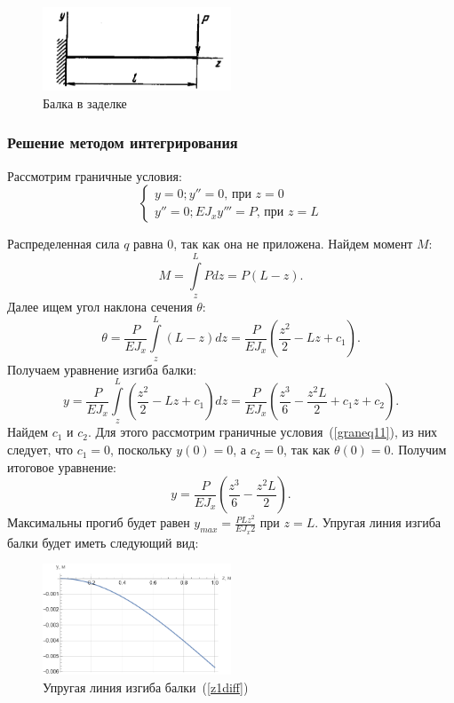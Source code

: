 \documentclass[12pt, a4paper]{article}
\begin{document}
\begin{figure}[!h]
	\centering
	\includegraphics[width=0.5\textwidth]{pic.7}%
	\caption{Балка в заделке}
	\vspace*{-2mm}
	\label{pic7}
\end{figure}

\subsubsection{Решение методом интегрирования}
Рассмотрим граничные условия:
\begin{equation}
	\label{graneq11}
	\begin{cases}
		y = 0; y'' = 0\mbox{, при } z = 0\\
		y'' = 0; E J_{x} y''' = P\mbox{, при } z = L
	\end{cases}
\end{equation}

Распределенная сила $q$ равна  0, так как она не приложена. Найдем момент $M$:
\[
	M = \int\limits_z^L P d z = P(L - z).
\]
Далее ищем угол наклона сечения $\theta$:
\[
 	\theta = \frac{P}{E J_{x}} \int\limits_z^L (L - z)d z = \frac{P}{E J_{x}} \left(\frac{z^2}{2} - L z + c_1\right).
\] 
Получаем уравнение изгиба балки: 
\[
	y = \frac{P}{E J_{x}} \int\limits_z^L \left(\frac{z^2}{2} - L z + c_1\right) d z = \frac{P}{E J_{x}} \left(\frac{z^3}{6} - \frac{z^2 L}{2} + c_1 z + c_2\right).
\]
Найдем $c_1$ и $c_2$. Для этого рассмотрим граничные условия~(\ref{graneq11}), из них следует, что $c_1 = 0$, поскольку $y(0) = 0$, а $c_2 = 0$, так как $\theta(0) = 0$. Получим итоговое уравнение: 
\begin{equation}
	\label{z1diff}
	y = \frac{P}{E J_{x}} \left(\frac{z^3}{6} - \frac{z^2 L}{2}\right).
\end{equation}
Максимальны прогиб будет равен $y_{max} = \frac{P L z^2}{E J_{x} 2}$ при $z = L$. Упругая линия изгиба балки будет иметь следующий вид:
\begin{figure}[!h]
	\centering
	\includegraphics[width=0.5\textwidth]{g.1}%
	\caption{Упругая линия изгиба балки~(\ref{z1diff})}
	\vspace*{-2mm}
	\label{g1}
\end{figure}
\end{document}
